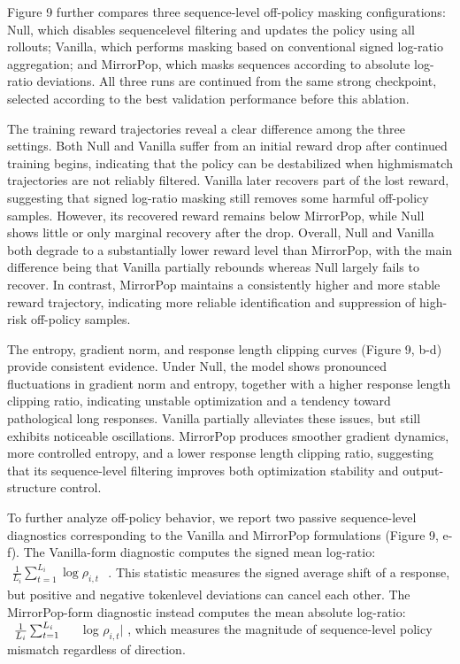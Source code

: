 \documentclass[
  10
]{article}
\begin{document}
Figure 9 further compares three sequence-level off-policy masking
configurations: Null, which disables sequencelevel filtering and updates
the policy using all rollouts; Vanilla, which performs masking based on
conventional signed log-ratio aggregation; and MirrorPop, which masks
sequences according to absolute log-ratio deviations. All three runs are
continued from the same strong checkpoint, selected according to the
best validation performance before this ablation.

The training reward trajectories reveal a clear difference among the
three settings. Both Null and Vanilla suffer from an initial reward drop
after continued training begins, indicating that the policy can be
destabilized when highmismatch trajectories are not reliably filtered.
Vanilla later recovers part of the lost reward, suggesting that signed
log-ratio masking still removes some harmful off-policy samples.
However, its recovered reward remains below MirrorPop, while Null shows
little or only marginal recovery after the drop. Overall, Null and
Vanilla both degrade to a substantially lower reward level than
MirrorPop, with the main difference being that Vanilla partially
rebounds whereas Null largely fails to recover. In contrast, MirrorPop
maintains a consistently higher and more stable reward trajectory,
indicating more reliable identification and suppression of high-risk
off-policy samples.

The entropy, gradient norm, and response length clipping curves (Figure
9, b-d) provide consistent evidence. Under Null, the model shows
pronounced fluctuations in gradient norm and entropy, together with a
higher response length clipping ratio, indicating unstable optimization
and a tendency toward pathological long responses. Vanilla partially
alleviates these issues, but still exhibits noticeable oscillations.
MirrorPop produces smoother gradient dynamics, more controlled entropy,
and a lower response length clipping ratio, suggesting that its
sequence-level filtering improves both optimization stability and
output-structure control.

To further analyze off-policy behavior, we report two passive
sequence-level diagnostics corresponding to the Vanilla and MirrorPop
formulations (Figure 9, e-f). The Vanilla-form diagnostic computes the
signed mean log-ratio:
\(\begin{array} { r } { \frac { 1 } { L _ { i } } \sum _ { t = 1 } ^ { L _ { i } } \log \rho _ { i , t } } \end{array}\)
. This statistic measures the signed average shift of a response, but
positive and negative tokenlevel deviations can cancel each other. The
MirrorPop-form diagnostic instead computes the mean absolute log-ratio:
\(\begin{array} { r l } {  { \frac { 1 } { L _ { i } } \sum _ { t = 1 } ^ { L _ { i } } } } & { { } } \end{array}\)
\textbar log \(\rho _ { i , t } |\) , which measures the magnitude of
sequence-level policy mismatch regardless of direction.
\end{document}
